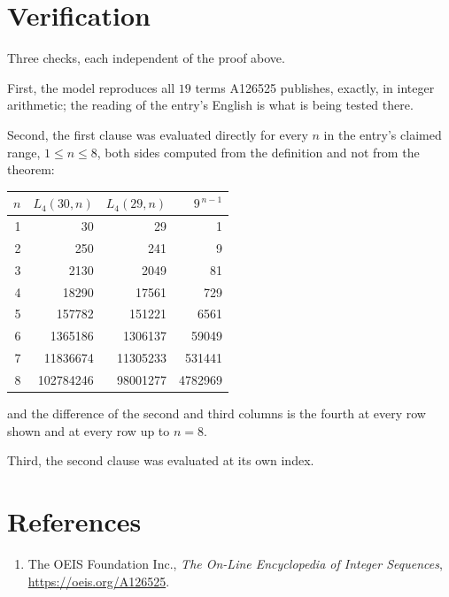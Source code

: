 \documentclass[11pt,a4paper]{article}
\theoremstyle{plain}
\theoremstyle{definition}
\begin{document}
\section{Verification}

Three checks, each independent of the proof above.

First, the model reproduces all $19$ terms A126525 publishes, exactly, in integer
arithmetic; the reading of the entry's English is what is being tested there.

Second, the first clause was evaluated directly for every $n$ in the entry's claimed range,
$1\le n\le8$, both sides computed from the definition and not from the theorem:

\begin{center}
\begin{tabular}{rrrr}
$n$ & $L_{4}(30,n)$ & $L_{4}(29,n)$ & $9^{\,n-1}$ \\ \hline
1 & 30 & 29 & 1 \\
2 & 250 & 241 & 9 \\
3 & 2130 & 2049 & 81 \\
4 & 18290 & 17561 & 729 \\
5 & 157782 & 151221 & 6561 \\
6 & 1365186 & 1306137 & 59049 \\
7 & 11836674 & 11305233 & 531441 \\
8 & 102784246 & 98001277 & 4782969 \\
\end{tabular}
\end{center}

\noindent and the difference of the second and third columns is the fourth at every row shown
and at every row up to $n=8$.

Third, the second clause was evaluated at its own index.

\section*{References}
\begin{enumerate}
\item The OEIS Foundation Inc., \emph{The On-Line Encyclopedia of Integer Sequences},
\url{https://oeis.org/A126525}.
\end{enumerate}
\end{document}
